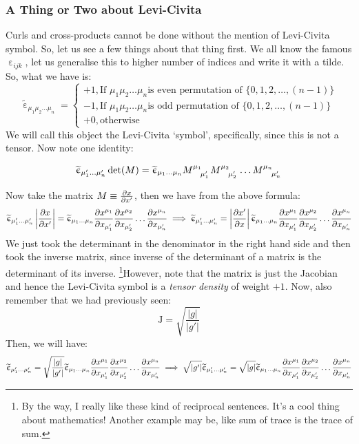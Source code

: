 \subsubsection{A Thing or Two about Levi-Civita}\label{sec:levi}
Curls and cross-products cannot be done without the mention of Levi-Civita symbol. So, let us see a few things about that thing first. 
We all know the famous $\upepsilon_{ijk}$, let us generalise this to higher number of indices and write it with a tilde. So, what we have is:
$$\widetilde{\upepsilon}_{\mu_1\mu_2\ldots\mu_n} = \begin{cases}
    +1, \text{If } {\mu_1\mu_2\ldots\mu_n} \text{is even permutation of } \{0,1,2,\ldots, (n-1)\} \\
     -1, \text{If } {\mu_1\mu_2\ldots\mu_n} \text{is odd permutation of } \{0,1,2,\ldots, (n-1)\}\\
     +0, \text{otherwise}
\end{cases}$$
We will call this object the Levi-Civita `symbol', specifically, since this is not a tensor. Now note one identity:
\begin{identity}
$$\widetilde{\upepsilon}_{\mu_1'\ldots \mu_n'}\det(M)= \widetilde{\upepsilon}_{\mu_1\ldots \mu_n} \tensor{M}{^{\mu_1} _{\mu_1'}}\tensor{M}{^{\mu_2} _{\mu_2'}}\ldots\tensor{M}{^{\mu_n} _{\mu_n'}}$$
\end{identity}
Now take the matrix $M \equiv \pdv{x}{x'}$, then we have from the above formula:
$$\widetilde{\upepsilon}_{\mu_1'\ldots \mu_n'}\left|\pdv{x}{x'}\right|= \widetilde{\upepsilon}_{\mu_1\ldots \mu_n} \pdv{x^{\mu_1}}{x_{\mu_1'}}\pdv{x^{\mu_2}}{x_{\mu_2'}}\ldots\pdv{x^{\mu_n}}{x_{\mu_n'}}\implies\widetilde{\upepsilon}_{\mu_1'\ldots \mu_n'}=\left|\pdv{x'}{x}\right| \widetilde{\upepsilon}_{\mu_1\ldots \mu_n} \pdv{x^{\mu_1}}{x_{\mu_1'}}\pdv{x^{\mu_2}}{x_{\mu_2'}}\ldots\pdv{x^{\mu_n}}{x_{\mu_n'}} $$
We just took the determinant in the denominator in the right hand side and then took the inverse matrix, since inverse of the determinant of a matrix is the determinant of its inverse. \footnote{By the way, I really like these kind of reciprocal sentences. It's a cool thing about mathematics! Another example may be, like sum of trace is the trace of sum.}However, note that the matrix is just the Jacobian and hence the Levi-Civita symbol is a \textit{tensor density} of weight $+1$. Now, also remember that we had previously seen:
$$\mathrm{J} = \sqrt{\frac{|g|}{|g'|}}$$
Then, we will have:
$$\widetilde{\upepsilon}_{\mu_1'\ldots \mu_n'}= \sqrt{\frac{|g|}{|g'|}} \widetilde{\upepsilon}_{\mu_1\ldots \mu_n} \pdv{x^{\mu_1}}{x_{\mu_1'}}\pdv{x^{\mu_2}}{x_{\mu_2'}}\ldots\pdv{x^{\mu_n}}{x_{\mu_n'}}\implies \sqrt{{|g'|}}\widetilde{\upepsilon}_{\mu_1'\ldots \mu_n'}= \sqrt{{|g|}} \widetilde{\upepsilon}_{\mu_1\ldots \mu_n} \pdv{x^{\mu_1}}{x_{\mu_1'}}\pdv{x^{\mu_2}}{x_{\mu_2'}}\ldots\pdv{x^{\mu_n}}{x_{\mu_n'}} $$
